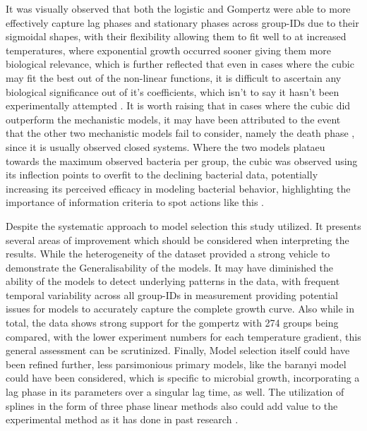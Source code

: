 \documentclass[11pt]{article}
\begin{document}
It was visually observed that both the logistic and Gompertz were able to more effectively capture lag phases and stationary phases across group-IDs due to their sigmoidal shapes, with their flexibility allowing them to fit well to at increased temperatures, where exponential growth occurred sooner giving them more biological relevance, which is further reflected that even in cases where the cubic may fit the best out of the non-linear functions, it is difficult to ascertain any biological significance out of it's coefficients, which isn't to say it hasn't been experimentally attempted \cite{garcia2021primary}. It is worth raising that in cases where the cubic did outperform the mechanistic models, it may have been attributed to the event that the other two mechanistic models fail to consider, namely the death phase \cite{Peleg01122011}, since it is usually observed closed systems. Where the two models plataeu towards the maximum observed bacteria per group, the cubic was observed using its inflection points to overfit to the declining bacterial data, potentially increasing its perceived efficacy in modeling bacterial behavior, highlighting the importance of information criteria to spot actions like this \cite{johnson2004model}.

Despite the systematic approach to model selection this study utilized. It presents several areas of improvement which should be considered when interpreting the results. While the heterogeneity of the dataset provided a strong vehicle to demonstrate the Generalisability of the models. It may have diminished the ability of the models to detect underlying patterns in the data, with frequent temporal variability across all group-IDs in measurement providing potential issues for models to accurately capture the complete growth curve. Also while in total, the data shows strong support for the gompertz with 274 groups being compared, with the lower experiment numbers for each temperature gradient, this general assessment can be scrutinized. Finally, Model selection itself could have been refined further, less parsimonious primary models, like the baranyi model could have been considered, which is specific to microbial growth, incorporating a lag phase in its parameters over a singular lag time, as well. The utilization of splines in the form of three phase linear methods also could add value to the experimental method as it has done in past research \cite{buchanan1997simple}.  
\end{document}
